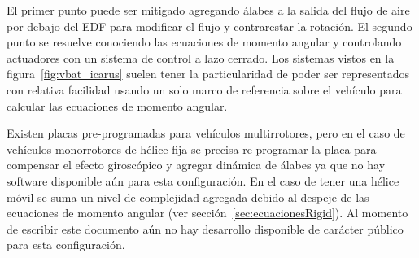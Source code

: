 El primer punto puede ser mitigado agregando álabes a la salida del flujo de aire por debajo del EDF para modificar el flujo y contrarestar la rotación. El segundo punto se resuelve conociendo las ecuaciones de momento angular y controlando actuadores con un sistema de control a lazo cerrado. Los sistemas vistos en la figura~\ref{fig:vbat_icarus} suelen tener la particularidad de poder ser representados con relativa facilidad usando un solo marco de referencia sobre el vehículo para calcular las ecuaciones de momento angular.

\medskip

Existen placas pre-programadas para vehículos multirrotores, pero en el caso de vehículos monorrotores de hélice fija se precisa re-programar la placa para compensar el efecto giroscópico y agregar dinámica de álabes ya que no hay software disponible aún para esta configuración. En el caso de tener una hélice móvil se suma un nivel de complejidad agregada debido al despeje de las ecuaciones de momento angular (ver sección~\ref{sec:ecuacionesRigid}). Al momento de escribir este documento aún no hay desarrollo disponible de carácter público para esta configuración.